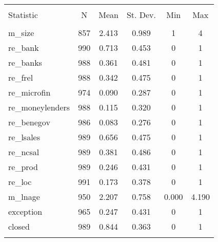 
\begin{table}[!htbp] \centering 
  \caption{} 
  \label{} 
\begin{tabular}{@{\extracolsep{5pt}}lccccc} 
\\[-1.8ex]\hline 
\hline \\[-1.8ex] 
Statistic & \multicolumn{1}{c}{N} & \multicolumn{1}{c}{Mean} & \multicolumn{1}{c}{St. Dev.} & \multicolumn{1}{c}{Min} & \multicolumn{1}{c}{Max} \\ 
\hline \\[-1.8ex] 
m\_size & 857 & 2.413 & 0.989 & 1 & 4 \\ 
re\_bank & 990 & 0.713 & 0.453 & 0 & 1 \\ 
re\_banks & 988 & 0.361 & 0.481 & 0 & 1 \\ 
re\_frel & 988 & 0.342 & 0.475 & 0 & 1 \\ 
re\_microfin & 974 & 0.090 & 0.287 & 0 & 1 \\ 
re\_moneylenders & 988 & 0.115 & 0.320 & 0 & 1 \\ 
re\_benegov & 986 & 0.083 & 0.276 & 0 & 1 \\ 
re\_lsales & 989 & 0.656 & 0.475 & 0 & 1 \\ 
re\_ncsal & 989 & 0.381 & 0.486 & 0 & 1 \\ 
re\_prod & 989 & 0.246 & 0.431 & 0 & 1 \\ 
re\_loc & 991 & 0.173 & 0.378 & 0 & 1 \\ 
m\_lnage & 950 & 2.207 & 0.758 & 0.000 & 4.190 \\ 
exception & 965 & 0.247 & 0.431 & 0 & 1 \\ 
closed & 989 & 0.844 & 0.363 & 0 & 1 \\ 
\hline \\[-1.8ex] 
\end{tabular} 
\end{table} 
